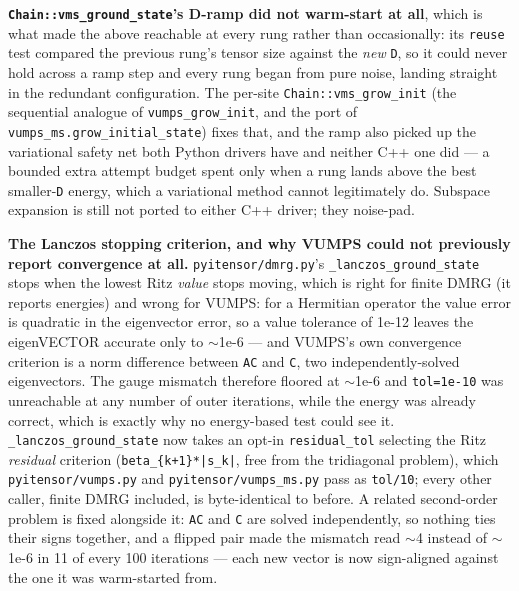 \documentclass[11pt]{article}
\begin{document}
\textbf{\texttt{Chain::vms\_ground\_state}'s D-ramp did not warm-start at
all}, which is what made the above reachable at every rung rather than
occasionally: its \texttt{reuse} test compared the previous rung's tensor
size against the \emph{new} \texttt{D}, so it could never hold across a
ramp step and every rung began from pure noise, landing straight in the
redundant configuration. The per-site \texttt{Chain::vms\_grow\_init} (the
sequential analogue of \texttt{vumps\_grow\_init}, and the port of
\texttt{vumps\_ms.grow\_initial\_state}) fixes that, and the ramp also
picked up the variational safety net both Python drivers have and neither
C++ one did --- a bounded extra attempt budget spent only when a rung lands
above the best smaller-\texttt{D} energy, which a variational method cannot
legitimately do. Subspace expansion is still not ported to either C++
driver; they noise-pad.

\textbf{The Lanczos stopping criterion, and why VUMPS could not previously
report convergence at all.} \texttt{pyitensor/dmrg.py}'s
\texttt{\_lanczos\_ground\_state} stops when the lowest Ritz \emph{value}
stops moving, which is right for finite DMRG (it reports energies) and
wrong for VUMPS: for a Hermitian operator the value error is quadratic in
the eigenvector error, so a value tolerance of 1e-12 leaves the
eigenVECTOR accurate only to $\sim$1e-6 --- and VUMPS's own convergence
criterion is a norm difference between \texttt{AC} and \texttt{C}, two
independently-solved eigenvectors. The gauge mismatch therefore floored at
$\sim$1e-6 and \texttt{tol=1e-10} was unreachable at any number of outer
iterations, while the energy was already correct, which is exactly why no
energy-based test could see it. \texttt{\_lanczos\_ground\_state} now takes
an opt-in \texttt{residual\_tol} selecting the Ritz \emph{residual}
criterion (\texttt{beta\_\{k+1\}*|s\_k|}, free from the tridiagonal
problem), which \texttt{pyitensor/vumps.py} and
\texttt{pyitensor/vumps\_ms.py} pass as \texttt{tol/10}; every other
caller, finite DMRG included, is byte-identical to before. A related
second-order problem is fixed alongside it: \texttt{AC} and \texttt{C} are
solved independently, so nothing ties their signs together, and a flipped
pair made the mismatch read $\sim$4 instead of $\sim$1e-6 in 11 of every
100 iterations --- each new vector is now sign-aligned against the one it
was warm-started from.
\end{document}
